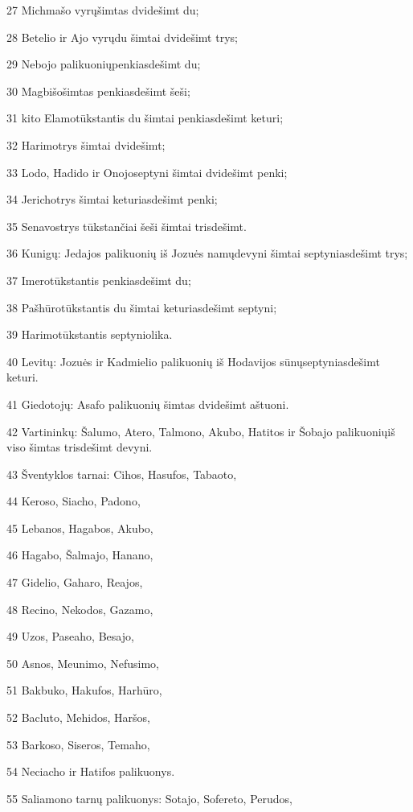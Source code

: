 \par 27 Michmašo vyrų­šimtas dvidešimt du; 
\par 28 Betelio ir Ajo vyrų­du šimtai dvidešimt trys; 
\par 29 Nebojo palikuonių­penkiasdešimt du; 
\par 30 Magbišo­šimtas penkiasdešimt šeši; 
\par 31 kito Elamo­tūkstantis du šimtai penkiasdešimt keturi; 
\par 32 Harimo­trys šimtai dvidešimt; 
\par 33 Lodo, Hadido ir Onojo­septyni šimtai dvidešimt penki; 
\par 34 Jericho­trys šimtai keturiasdešimt penki; 
\par 35 Senavos­trys tūkstančiai šeši šimtai trisdešimt. 
\par 36 Kunigų: Jedajos palikuonių iš Jozuės namų­devyni šimtai septyniasdešimt trys; 
\par 37 Imero­tūkstantis penkiasdešimt du; 
\par 38 Pašhūro­tūkstantis du šimtai keturiasdešimt septyni; 
\par 39 Harimo­tūkstantis septyniolika. 
\par 40 Levitų: Jozuės ir Kadmielio palikuonių iš Hodavijos sūnų­septyniasdešimt keturi. 
\par 41 Giedotojų: Asafo palikuonių­ šimtas dvidešimt aštuoni. 
\par 42 Vartininkų: Šalumo, Atero, Talmono, Akubo, Hatitos ir Šobajo palikuonių­iš viso šimtas trisdešimt devyni. 
\par 43 Šventyklos tarnai: Cihos, Hasufos, Tabaoto, 
\par 44 Keroso, Siacho, Padono, 
\par 45 Lebanos, Hagabos, Akubo, 
\par 46 Hagabo, Šalmajo, Hanano, 
\par 47 Gidelio, Gaharo, Reajos, 
\par 48 Recino, Nekodos, Gazamo, 
\par 49 Uzos, Paseaho, Besajo, 
\par 50 Asnos, Meunimo, Nefusimo, 
\par 51 Bakbuko, Hakufos, Harhūro, 
\par 52 Bacluto, Mehidos, Haršos, 
\par 53 Barkoso, Siseros, Temaho, 
\par 54 Neciacho ir Hatifos palikuonys. 
\par 55 Saliamono tarnų palikuonys: Sotajo, Sofereto, Perudos, 
